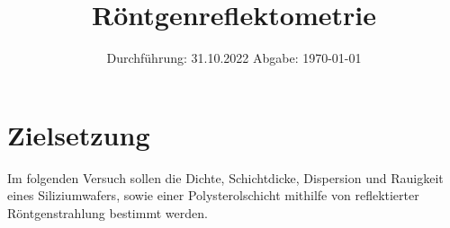 

\subject{V44}
\title{Röntgenreflektometrie}
\date{
    Durchführung: 31.10.2022
     \hspace{3em}
    Abgabe: \today %
}


\maketitle
\thispagestyle{empty}
\tableofcontents
\newpage

\section{Zielsetzung}

    Im folgenden Versuch sollen die Dichte,
    Schichtdicke, 
    Dispersion und Rauigkeit eines Siliziumwafers,
    sowie einer Polysterolschicht mithilfe von reflektierter Röntgenstrahlung bestimmt werden.


\clearpage


\clearpage


\clearpage


\clearpage

\printbibliography


